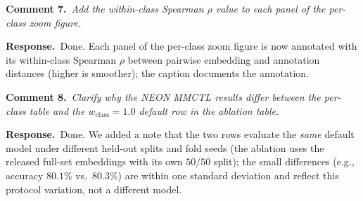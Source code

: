 \documentclass[10pt,twocolumn,letterpaper]{article}
\newcommand{\cmt}[2]{\smallskip\noindent\textbf{Comment #1.}\ \textit{#2}\par}
\newcommand{\resp}[1]{\noindent\textbf{Response.}\ #1\par}
\begin{document}
{\cmt{7}{Add the within-class Spearman $\rho$ value to each panel of the per-class
zoom figure.}
\resp{Done. Each panel of the per-class zoom figure is now annotated with its
within-class Spearman $\rho$ between pairwise embedding and annotation distances
(higher is smoother); the caption documents the annotation.}

\cmt{8}{Clarify why the NEON MMCTL results differ between the per-class table and
the $w_{\text{class}}{=}1.0$ default row in the ablation table.}
\resp{Done. We added a note that the two rows evaluate the \emph{same} default
model under different held-out splits and fold seeds (the ablation uses the
released full-set embeddings with its own $50/50$ split); the small differences
(e.g., accuracy $80.1\%$ vs.\ $80.3\%$) are within one standard deviation and
reflect this protocol variation, not a different model.}
}
\end{document}
